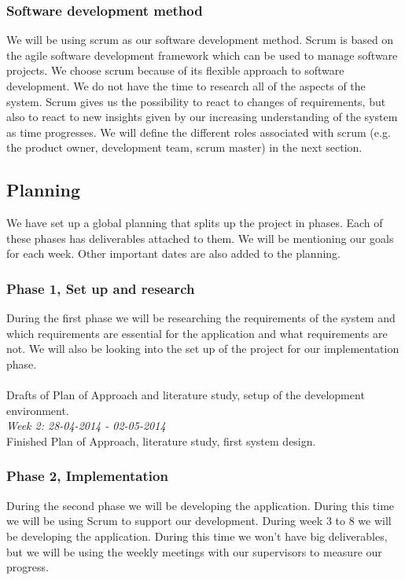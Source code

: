 \documentclass[]{article}
\begin{document}
\subsubsection{Software development method}
We will be using scrum as our software development method.
Scrum is based on the agile software development framework which can be used to manage software projects.
We choose scrum because of its flexible approach to software development.
We do not have the time to research all of the aspects of the system.
Scrum gives us the possibility to react to changes of requirements, but also to react to new insights given by our increasing understanding of the system as time progresses.
We will define the different roles associated with scrum (e.g. the product owner, development team, scrum master) in the next section.

\subsection{Planning}
We have set up a global planning that splits up the project in phases.
Each of these phases has deliverables attached to them.
We will be mentioning our goals for each week.
Other important dates are also added to the planning.

\subsubsection{Phase 1, Set up and research}
During the first phase we will be researching the requirements of the system and which requirements are essential for the application and what requirements are not.
We will also be looking into the set up of the project for our implementation phase.\\

\\
Drafts of Plan of Approach and literature study, setup of the development environment.\\
\noindent\emph{Week 2: 28-04-2014 - 02-05-2014}\\
Finished Plan of Approach, literature study, first system design.

\subsubsection{Phase 2, Implementation}
During the second phase we will be developing the application.
During this time we will be using Scrum to support our development.
During week 3 to 8 we will be developing the application.
During this time we won't have big deliverables, but we will be using the weekly meetings with our supervisors to measure our progress.\\
\end{document}
